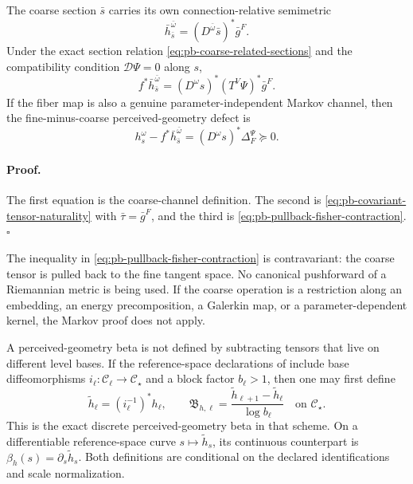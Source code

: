 The coarse section $\bar s$ carries its own connection-relative semimetric
\begin{equation}
\bar h_{\bar s}^{\bar\omega}
=(D^{\bar\omega}\bar s)^*\bar g^F.
\label{eq:pb-meta-perceived-geometry}
\end{equation}
Under the exact section relation \eqref{eq:pb-coarse-related-sections} and
the compatibility condition $\mathcal D\Psi=0$ along $s$,
\begin{equation}
f^*\bar h_{\bar s}^{\bar\omega}
=(D^\omega s)^*(T^V\Psi)^*\bar g^F.
\label{eq:pb-meta-perceived-naturality}
\end{equation}
If the fiber map is also a genuine parameter-independent Markov channel,
then the fine-minus-coarse perceived-geometry defect is
\begin{equation}
h_s^\omega-f^*\bar h_{\bar s}^{\bar\omega}
=(D^\omega s)^*\Delta_F^\Psi\succeq0.
\label{eq:pb-meta-perceived-defect}
\end{equation}

\paragraph{Proof.}
The first equation is the coarse-channel definition.  The second is
\eqref{eq:pb-covariant-tensor-naturality} with
$\bar\tau=\bar g^F$, and the third is
\eqref{eq:pb-pullback-fisher-contraction}.  $\square$

The inequality in \eqref{eq:pb-pullback-fisher-contraction} is
contravariant: the coarse tensor is pulled back to the fine tangent space.
No canonical pushforward of a Riemannian metric is being used.  If the coarse
operation is a restriction along an embedding, an energy precomposition, a
Galerkin map, or a parameter-dependent kernel, the Markov proof does not
apply.  

A perceived-geometry beta is not defined by subtracting tensors that live on
different level bases.  If the reference-space declarations of
 include base diffeomorphisms
$i_\ell:\mathcal C_\ell\to\mathcal C_\star$ and a block factor
$b_\ell>1$, then one may first define
\begin{equation}
\widetilde h_\ell=(i_\ell^{-1})^*h_\ell,
\qquad
\mathfrak B_{h,\ell}
=\frac{\widetilde h_{\ell+1}-\widetilde h_\ell}{\log b_\ell}
\quad\text{on }\mathcal C_\star.
\label{eq:pb-metric-beta-reference}
\end{equation}
This is the exact discrete perceived-geometry beta in that scheme.  On a
differentiable reference-space curve $s\mapsto\widetilde h_s$, its continuous
counterpart is $\beta_h(s)=\partial_s\widetilde h_s$. Both definitions are
conditional on the declared identifications and scale normalization.

